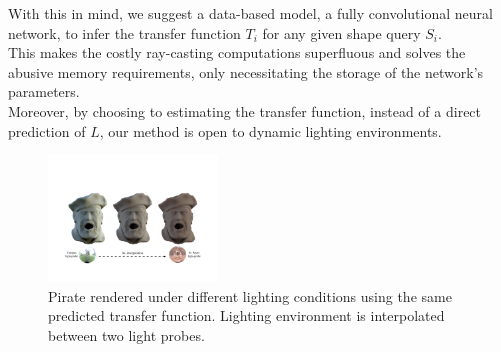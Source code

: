 With this in mind, we suggest a data-based model, a fully convolutional neural network, to infer the transfer function $T_i$ for any given shape query $S_i$. \\
This makes the costly ray-casting computations superfluous and solves the abusive memory requirements, only necessitating the storage of the network's parameters. \\
Moreover, by choosing to estimating the transfer function, instead of a direct prediction of $L$, our method is open to  dynamic lighting environments.
\begin{figure}[H]
  \centering
    \includegraphics[width=0.4\textwidth]{Figures/varying_lighting}
     \caption{Pirate rendered under different lighting conditions using the same predicted transfer function. Lighting environment is interpolated between two light probes.}
     \label{Fig: Varying lighting}
\end{figure}
